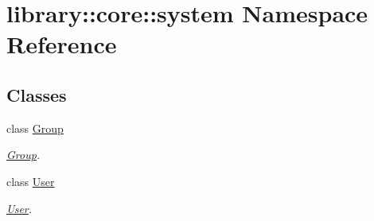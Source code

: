 \hypertarget{namespacelibrary_1_1core_1_1system}{}\section{library\+:\+:core\+:\+:system Namespace Reference}
\label{namespacelibrary_1_1core_1_1system}
\subsection*{Classes}
\begin{DoxyCompactItemize}
\item 
class \hyperlink{classlibrary_1_1core_1_1system_1_1_group}{Group}
\begin{DoxyCompactList}\small\item\em \hyperlink{classlibrary_1_1core_1_1system_1_1_group}{Group}. \end{DoxyCompactList}\item 
class \hyperlink{classlibrary_1_1core_1_1system_1_1_user}{User}
\begin{DoxyCompactList}\small\item\em \hyperlink{classlibrary_1_1core_1_1system_1_1_user}{User}. \end{DoxyCompactList}\end{DoxyCompactItemize}
